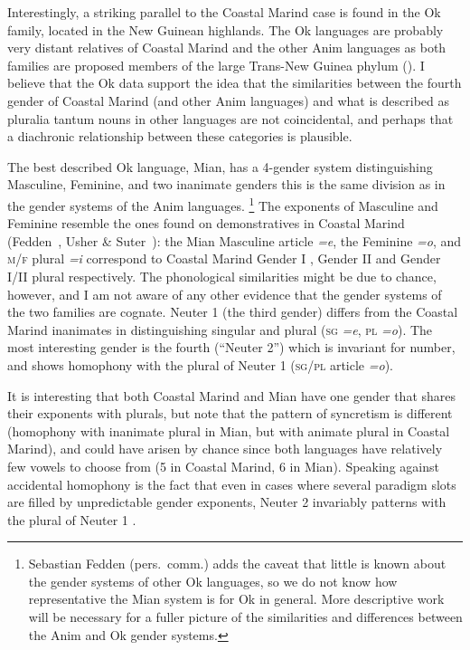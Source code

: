 \documentclass[output=collectionpaper]{langsci/langscibook}
\begin{document}
Interestingly, a striking parallel to the Coastal Marind case is found in the Ok family, located in the New Guinean highlands. The Ok languages are probably very distant relatives of Coastal Marind and the other Anim languages as both families are proposed members of the large Trans-New Guinea phylum (\citealt{Fedden2011, Usher2015}). I believe that the Ok data support the idea that the similarities between the fourth gender of Coastal Marind (and other Anim languages) and what is described as pluralia tantum nouns in other languages are not coincidental, and perhaps that a diachronic relationship between these categories is plausible.

The best described Ok language, Mian, has a 4-gender system distinguishing Masculine, Feminine, and two inanimate genders \textendash{} this is the same division as in the gender systems of the Anim languages.%
\footnote{Sebastian Fedden (pers.\ comm.\@) adds the caveat that little is known about the gender systems of other Ok languages, so we do not know how representative the Mian system is for Ok in general. More descriptive work will be necessary for a fuller picture of the similarities and differences between the Anim and Ok gender systems.
} %
The exponents of Masculine and Feminine resemble the ones found on demonstratives in Coastal Marind (Fedden~\citeyear[170]{Fedden2011}, Usher \& Suter~\citeyear[118]{Usher2015}): the Mian Masculine article \emph{=e}, the Feminine \emph{=o}, and \textsc{m}/\textsc{f} plural \emph{=i} correspond to Coastal Marind Gender I , Gender II  and Gender I/II plural  respectively. The phonological similarities might be due to chance, however, and I am not aware of any other evidence that the gender systems of the two families are cognate. Neuter 1 (the third gender) differs from the Coastal Marind inanimates in distinguishing singular and plural (\textsc{sg} \emph{=e}, \textsc{pl} \emph{=o}). The most interesting gender is the fourth (``Neuter 2'') which is invariant for number, and shows homophony with the plural of Neuter 1 (\textsc{sg}/\textsc{pl} article \emph{=o}).

It is interesting that both Coastal Marind and Mian have one gender that shares their exponents with plurals, but note that the pattern of syncretism is different (homophony with inanimate plural in Mian, but with animate plural in Coastal Marind), and could have arisen by chance since both languages have relatively few vowels to choose from (5 in Coastal Marind, 6 in Mian). Speaking against accidental homophony is the fact that even in cases where several paradigm slots are filled by unpredictable gender exponents, Neuter 2 invariably patterns with the plural of Neuter 1 \citep[178--179]{Fedden2011}.
\end{document}
